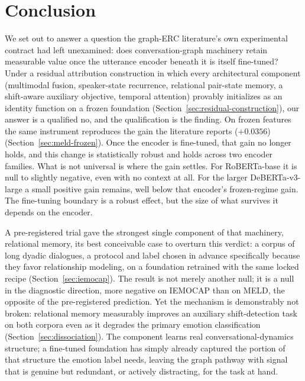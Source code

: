 \section{Conclusion}
\label{sec:conclusion}

We set out to answer a question the graph-ERC literature's own experimental contract had left unexamined: does conversation-graph machinery retain measurable value once the utterance encoder beneath it is itself fine-tuned? Under a residual attribution construction in which every architectural component (multimodal fusion, speaker-state recurrence, relational pair-state memory, a shift-aware auxiliary objective, temporal attention) provably initializes as an identity function on a frozen foundation (Section~\ref{sec:residual-construction}), our answer is a qualified no, and the qualification is the finding. On frozen features the same instrument reproduces the gain the literature reports ($+0.0356$) (Section~\ref{sec:meld-frozen}). Once the encoder is fine-tuned, that gain no longer holds, and this change is statistically robust and holds across two encoder families. What is not universal is where the gain settles. For RoBERTa-base it is null to slightly negative, even with no context at all. For the larger DeBERTa-v3-large a small positive gain remains, well below that encoder's frozen-regime gain. The fine-tuning boundary is a robust effect, but the size of what survives it depends on the encoder.

A pre-registered trial gave the strongest single component of that machinery, relational memory, its best conceivable case to overturn this verdict: a corpus of long dyadic dialogues, a protocol and label chosen in advance specifically because they favor relationship modeling, on a foundation retrained with the same locked recipe (Section~\ref{sec:iemocap}). The result is not merely another null; it is a null in the diagnostic direction, more negative on IEMOCAP than on MELD, the opposite of the pre-registered prediction. Yet the mechanism is demonstrably not broken: relational memory measurably improves an auxiliary shift-detection task on both corpora even as it degrades the primary emotion classification (Section~\ref{sec:dissociation}). The component learns real conversational-dynamics structure; a fine-tuned foundation has simply already captured the portion of that structure the emotion label needs, leaving the graph pathway with signal that is genuine but redundant, or actively distracting, for the task at hand.

